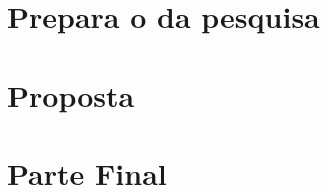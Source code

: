 \documentclass{article}
\begin{document}



\textual
\setcounter{page}{1}



\part{Prepara o da pesquisa}



\part{Proposta}



\part{Parte Final}



\postextual








%
\end{document}
